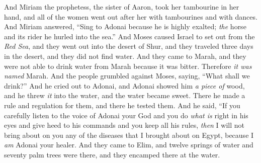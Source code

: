 \begin{biblechapter}
\verse And Miriam the prophetess, the sister of Aaron, took her tambourine in her hand, and all of the women went out after her with tambourines and with dances.
\verse And Miriam answered, “Sing to Adonai because he is highly exalted; \textit{the} horse and its rider he hurled into the sea.”
 And Moses caused Israel to set out from the \textit{Red Sea}, and they went out into the desert of Shur, and they traveled three days in the desert, and they did not find water.
\verse And they came to Marah, and they were not able to drink water from Marah because it was bitter. Therefore \textit{it was named} Marah.
\verse And the people grumbled against Moses, saying, “What shall we drink?”
\verse And he cried out to Adonai, and Adonai showed him \textit{a piece of} wood, and he threw \textit{it} into the water, and the water became sweet. There he made a rule and regulation for them, and there he tested them.
\verse And he said, “If you carefully listen to the voice of Adonai your God and you do \textit{what is} right in his eyes and give heed to his commands and you keep all his rules, \textit{then} I will not bring about on you any of the diseases that I brought about on Egypt, because I \textit{am} Adonai your healer.
\verse And they came to Elim, and twelve springs of water and seventy palm trees were there, and they encamped there at the water.
\end{biblechapter}

